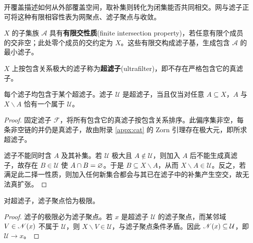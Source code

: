 开覆盖描述如何从外部覆盖空间，取补集则转化为闭集能否共同相交。网与滤子正可将这种有限相容性表为网聚点、滤子聚点与收敛。

\begin{definition}
    $X$ 的子集族 $\mathcal A$ 具有\textbf{有限交性质}(finite intersection property)，若任意有限个成员的交非空；此处零个成员的交约定为 $X$。这些有限交构成滤子基，生成包含 $\mathcal A$ 的最小滤子。
\end{definition}

\begin{definition}
    $X$ 上按包含关系极大的滤子称为\textbf{超滤子}(ultrafilter)，即不存在严格包含它的真滤子。
\end{definition}

\begin{theorem}\label{thm:ultrafilter-extension}
    每个滤子均包含于某个超滤子。滤子 $\mathcal U$ 是超滤子，当且仅当对任意 $A\subseteq X$，$A$ 与 $X\backslash A$ 恰有一个属于 $\mathcal U$。
\end{theorem}
\begin{proof}
    固定滤子 $\mathcal F$，将所有包含它的真滤子按包含关系排序。此偏序集非空，每条非空链的并仍是真滤子，故由附录 \ref{appx:cat} 的 Zorn 引理存在极大元，即所求超滤子。

    滤子不能同时含 $A$ 及其补集。若 $\mathcal U$ 极大且 $A\notin\mathcal U$，则加入 $A$ 后不能生成真滤子，故存在 $B\in\mathcal U$ 使 $A\cap B=\varnothing$。于是 $B\subseteq X\backslash A$，从而 $X\backslash A\in\mathcal U$。反之，若满足此二择一性质，则加入任何新集合都会与其已在滤子中的补集产生空交，故无法真扩张。
\end{proof}

\begin{theorem}
    对超滤子，滤子聚点恰为极限。
\end{theorem}
\begin{proof}
    滤子的极限必为滤子聚点。若 $x$ 是超滤子 $\mathcal U$ 的滤子聚点，而某邻域 $V\in\mathscr N(x)$ 不属于 $\mathcal U$，则 $X\backslash V\in\mathcal U$，与滤子聚点条件矛盾。因此 $\mathscr N(x)\subseteq\mathcal U$，即 $\mathcal U\to x$。
\end{proof}

